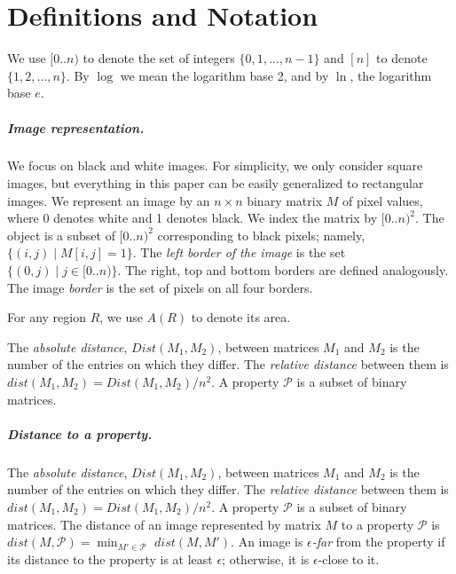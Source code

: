\documentclass[11pt,english]{article}
\numberwithin{figure}{section}
\newcommand{\eps}{{\epsilon}}
\newcommand{\dis}{dist}
\newcommand{\Dis}{Dist}
\newcommand{\integerset}[1]{[0..{#1})}
\begin{document}
\section{Definitions and Notation}\label{sec:defintions_notation}
We use $\integerset{n}$ to denote the set of integers $\{0,1,\ldots,n-1\}$ and $[n]$ to denote $\{1,2,\ldots,n\}$.
\ifnum{}
By $\log$ we mean the logarithm base 2, and by $\ln$, the logarithm base $e$.
\fi

\subparagraph{Image representation.}
We focus on black and white images. For simplicity, we only consider square images, but everything in this paper can be easily generalized to rectangular images.
We represent an image by an $n\times n$ binary matrix $M$ of pixel values, where 0 denotes white and 1 denotes black.
We index the matrix by $\integerset{n}^2$. The object is a subset of $\integerset{n}^2$
corresponding to black pixels; namely, $\{(i,j)\mid M[i,j]=1\}$.
\ifnum{}
The {\em left border of the image} is the set $\{(0,j)\mid j\in\integerset{n}\}$. The right, top and bottom borders are defined analogously. The image {\em border} is the set of pixels on all four borders.

For any region $R$, we use $A(R)$ to denote its area.
\fi

\ifnum{}
The {\em absolute distance}, $\Dis(M_1,M_2)$, between matrices $M_1$ and $M_2$ is the number of the entries on which they differ. The \emph{relative distance} between them is $\dis(M_{1},M_{2})=\Dis(M_{1},M_{2})/ n^{2}$.
A property $\mathcal{P}$ is a subset of binary matrices.
\else
\subparagraph{Distance to a property.} The {\em absolute distance}, $\Dis(M_1,M_2)$, between matrices $M_1$ and $M_2$ is the number of the entries on which they differ. The \emph{relative distance} between them is $\dis(M_{1},M_{2})=\Dis(M_{1},M_{2})/ n^{2}$.
A property $\mathcal{P}$ is a subset of binary matrices. The distance of an image represented by matrix $M$ to a property $\mathcal{P}$ is $\dis(M,\mathcal{P})=\min_{M'\in \mathcal{P}}$ $\dis(M,M')$. An image is {\em $\epsilon$-far} from the property if its distance to the property is at least $\epsilon$; otherwise, it is $\eps$-close to it.
\end{document}
